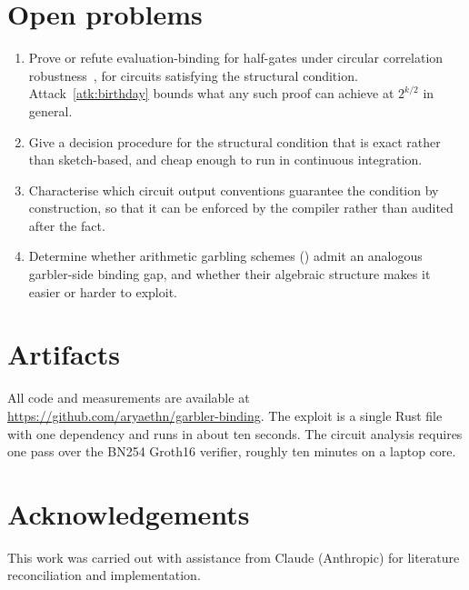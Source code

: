 \documentclass[11pt,a4paper]{article}
\theoremstyle{definition}
\theoremstyle{plain}
\begin{document}
\section{Open problems}

\begin{enumerate}[leftmargin=*,itemsep=2pt]
  \item Prove or refute evaluation-binding for half-gates under circular
    correlation robustness~\cite{GKWY20}, for circuits satisfying the structural
    condition. Attack~\ref{atk:birthday} bounds what any such proof can achieve
    at $2^{k/2}$ in general.
  \item Give a decision procedure for the structural condition that is exact
    rather than sketch-based, and cheap enough to run in continuous integration.
  \item Characterise which circuit output conventions guarantee the condition by
    construction, so that it can be enforced by the compiler rather than audited
    after the fact.
  \item Determine whether arithmetic garbling schemes
    (\cite{Glock,DutyFreeBits}) admit an analogous garbler-side binding gap, and
    whether their algebraic structure makes it easier or harder to exploit.
\end{enumerate}

\section*{Artifacts}

All code and measurements are available at
\url{https://github.com/aryaethn/garbler-binding}. The exploit is a single Rust
file with one dependency and runs in about ten seconds. The circuit analysis
requires one pass over the BN254 Groth16 verifier, roughly ten minutes on a
laptop core.

\section*{Acknowledgements}

This work was carried out with assistance from Claude (Anthropic)
for literature reconciliation and implementation.



\end{document}
